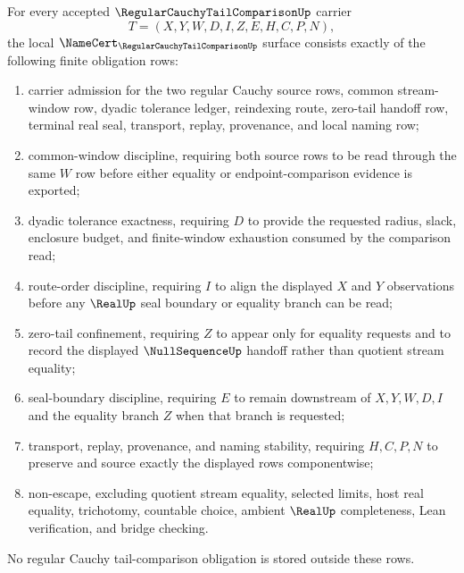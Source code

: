 \begin{theorem}
\label{thm:regular-cauchy-tail-comparison-namecert-obligations}
For every accepted $\RegularCauchyTailComparisonUp$ carrier
$$
T=(X,Y,W,D,I,Z,E,H,C,P,N),
$$
the local $\NameCert_{\RegularCauchyTailComparisonUp}$ surface consists exactly of the following finite obligation rows:
\begin{enumerate}
\item carrier admission for the two regular Cauchy source rows, common stream-window row, dyadic tolerance ledger, reindexing route, zero-tail handoff row, terminal real seal, transport, replay, provenance, and local naming row;
\item common-window discipline, requiring both source rows to be read through the same $W$ row before either equality or endpoint-comparison evidence is exported;
\item dyadic tolerance exactness, requiring $D$ to provide the requested radius, slack, enclosure budget, and finite-window exhaustion consumed by the comparison read;
\item route-order discipline, requiring $I$ to align the displayed $X$ and $Y$ observations before any $\RealUp$ seal boundary or equality branch can be read;
\item zero-tail confinement, requiring $Z$ to appear only for equality requests and to record the displayed $\NullSequenceUp$ handoff rather than quotient stream equality;
\item seal-boundary discipline, requiring $E$ to remain downstream of $X,Y,W,D,I$ and the equality branch $Z$ when that branch is requested;
\item transport, replay, provenance, and naming stability, requiring $H,C,P,N$ to preserve and source exactly the displayed rows componentwise;
\item non-escape, excluding quotient stream equality, selected limits, host real equality, trichotomy, countable choice, ambient $\RealUp$ completeness, Lean verification, and bridge checking.
\end{enumerate}
No regular Cauchy tail-comparison obligation is stored outside these rows.
\end{theorem}

